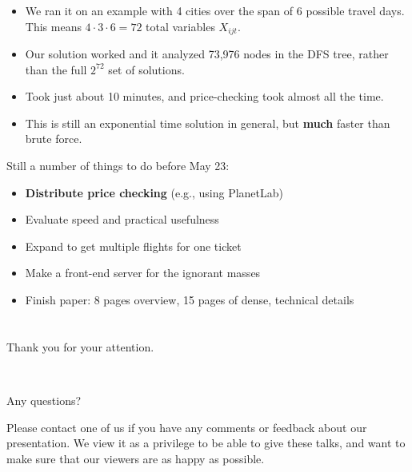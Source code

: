 \documentclass[10pt, xcolor=svgnames]{beamer}
\begin{document}
\begin{frame}
\begin{itemize}
    \item We ran it on an example with 4 cities over the span of 6 possible travel days. This means $4 \cdot 3 \cdot 6 = 72$ total variables $X_{ijt}$.
    \item Our solution worked and it analyzed 73,976 nodes in the DFS tree, rather than the full $2^{72}$ set of solutions.
    \item Took just about 10 minutes, and price-checking took almost all the time.
    \item This is still an exponential time solution in general, but \textbf{much} faster than brute force.
\end{itemize}
\end{frame}

\begin{frame}
Still a number of things to do before May 23:
\begin{itemize}
    \item \textbf{Distribute price checking} (e.g., using PlanetLab)
    \item Evaluate speed and practical usefulness
    \item Expand to get multiple flights for one ticket
    \item Make a front-end server for the ignorant masses
    \item Finish paper: 8 pages overview, 15 pages of dense, technical details
\end{itemize}
\end{frame}




\section{}
\begin{frame}
\begin{center}
\Large{Thank you for your attention.}

~

\Huge{Any questions?\\}
\end{center}

\begin{center}
Please contact one of us if you have any comments or feedback about our presentation. We view it as a privilege to be able to give these talks, and
want to make sure that our viewers are as happy as possible.
\end{center}
\end{frame}
\end{document}
